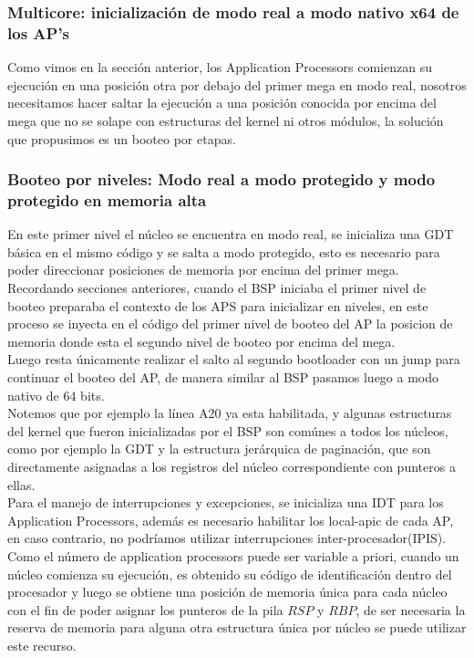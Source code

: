 \documentclass{beamer}
\begin{document}
	\begin{frame}
		\frametitle{Multicore: inicialización de modo real a modo nativo x64 de los AP's}
	    Como vimos en la sección anterior, los Application Processors comienzan su ejecución en una posición otra por debajo del primer mega en modo real, nosotros necesitamos hacer saltar la ejecución a una posición conocida por encima del mega que no se solape con estructuras del kernel ni otros módulos, la solución que propusimos es un booteo por etapas.
	    
	    \subsubsection{Booteo por niveles: Modo real a modo protegido y modo protegido en memoria alta}
	    En este primer nivel el núcleo se encuentra en modo real, se inicializa una GDT básica en el mismo código y se salta a modo protegido, esto es necesario para poder direccionar posiciones de memoria por encima del primer mega.\\

	    Recordando secciones anteriores, cuando el BSP iniciaba el primer nivel de booteo preparaba el contexto de los APS para inicializar en niveles, en este proceso se inyecta en el código del primer nivel de booteo del AP la posicion de memoria donde esta el segundo nivel de booteo por encima del mega.\\

	    Luego resta únicamente realizar el salto al segundo bootloader con un jump para continuar el booteo del AP, de manera similar al BSP pasamos luego a modo nativo de 64 bits.\\
	    Notemos que por ejemplo la línea A20 ya esta habilitada, y algunas estructuras del kernel que fueron inicializadas por el BSP son comúnes a todos los núcleos, como por ejemplo la GDT y la estructura jerárquica de paginación,
	    que son directamente asignadas a los registros del núcleo correspondiente con punteros a ellas.
	    \\
	    Para el manejo de interrupciones y excepciones, se inicializa una IDT para los Application Processors, además es necesario habilitar los local-apic de cada AP, en caso contrario, no podríamos utilizar interrupciones inter-procesador(IPIS).
	    \\

	    Como el número de application processors puede ser variable a priori, cuando un núcleo comienza su ejecución, es obtenido su código de identificación dentro del procesador y luego se obtiene una posición de memoria única para cada núcleo con el fin de poder asignar los punteros de la pila $RSP$ y $RBP$, de ser necesaria la reserva de memoria para alguna otra estructura única por núcleo se puede utilizar este recurso.
	\end{frame}
\end{document}
